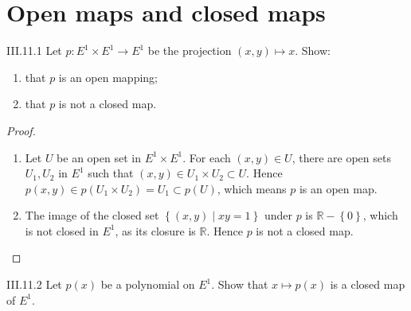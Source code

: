 \section{Open maps and closed maps}

\begin{problem}{III.11.1}
Let \( p: E^{1} \times E^{1} \to E^{1} \) be the projection \( (x, y) \mapsto x \). Show:
\begin{enumerate}[label={(\alph*)}]
	\item that \(p\) is an open mapping;
	\item that \(p\) is not a closed map.
\end{enumerate}
\end{problem}

\begin{proof}
	\begin{enumerate}[label={(\alph*)}]
		\item Let \( U \) be an open set in \( E^{1} \times E^{1} \). For each \( (x, y) \in U \), there are open sets \( U_{1}, U_{2} \) in \( E^{1} \) such that \( (x, y) \in U_{1} \times U_{2} \subset U \). Hence \( p(x, y) \in p(U_{1} \times U_{2}) = U_{1} \subset p(U) \), which means \( p \) is an open map.

		\item The image of the closed set \( \left\{ (x, y) \mid xy = 1 \right\} \) under \(p\) is \( \mathbb{R} - \left\{0\right\} \), which is not closed in \( E^{1} \), as its closure is \( \mathbb{R} \). Hence \(p\) is not a closed map.
	\end{enumerate}
\end{proof}

\begin{problem}{III.11.2}
Let \( p(x) \) be a polynomial on \(E^{1}\). Show that \( x \mapsto p(x) \) is a closed map of \( E^{1} \).
\end{problem}

